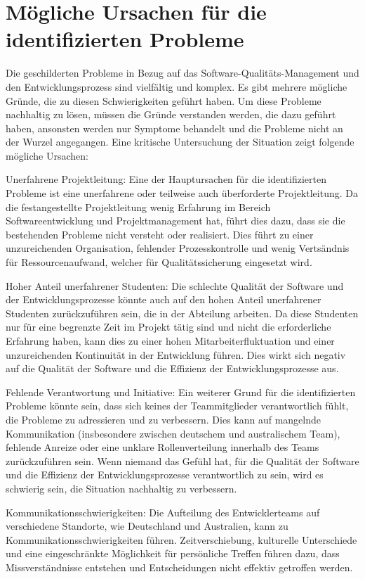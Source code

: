 \section{Mögliche Ursachen für die identifizierten Probleme}

Die geschilderten Probleme in Bezug auf das Software-Qualitäts-Management 
und den Entwicklungsprozess sind vielfältig und komplex. Es gibt mehrere mögliche Gründe, 
die zu diesen Schwierigkeiten geführt haben. Um diese Probleme nachhaltig zu lösen, 
müssen die Gründe verstanden werden, die dazu geführt haben, ansonsten werden nur 
Symptome behandelt und die Probleme nicht an der Wurzel angegangen. 
Eine kritische Untersuchung der Situation zeigt folgende mögliche Ursachen:

Unerfahrene Projektleitung: Eine der Hauptursachen für die identifizierten Probleme 
ist eine unerfahrene oder teilweise auch überforderte Projektleitung. 
Da die festangestellte Projektleitung wenig Erfahrung im Bereich Softwareentwicklung 
und Projektmanagement hat, führt dies dazu, dass sie die bestehenden Probleme nicht versteht 
oder realisiert. Dies führt zu einer unzureichenden Organisation, 
fehlender Prozesskontrolle und wenig Vertsändnis für Ressourcenaufwand, welcher für Qualitätssicherung 
eingesetzt wird.

Hoher Anteil unerfahrener Studenten: Die schlechte Qualität der Software 
und der Entwicklungsprozesse könnte auch auf den hohen Anteil unerfahrener Studenten zurückzuführen sein, 
die in der Abteilung arbeiten. Da diese Studenten nur für eine begrenzte Zeit
im Projekt tätig sind und nicht die erforderliche Erfahrung haben, 
kann dies zu einer hohen Mitarbeiterfluktuation und einer unzureichenden Kontinuität in der Entwicklung führen. 
Dies wirkt sich negativ auf die Qualität der Software und die Effizienz der Entwicklungsprozesse aus.

Fehlende Verantwortung und Initiative: Ein weiterer Grund für die identifizierten Probleme könnte sein, 
dass sich keines der Teammitglieder verantwortlich fühlt, die Probleme zu adressieren und zu verbessern. 
Dies kann auf mangelnde Kommunikation (insbesondere zwischen deutschem und australischem Team), 
fehlende Anreize oder eine unklare Rollenverteilung 
innerhalb des Teams zurückzuführen sein. Wenn niemand das Gefühl hat, 
für die Qualität der Software und die Effizienz der Entwicklungsprozesse verantwortlich zu sein, 
wird es schwierig sein, die Situation nachhaltig zu verbessern.

Kommunikationsschwierigkeiten: Die Aufteilung des Entwicklerteams auf verschiedene Standorte, 
wie Deutschland und Australien, kann zu Kommunikationsschwierigkeiten führen. 
Zeitverschiebung, kulturelle Unterschiede und eine eingeschränkte Möglichkeit 
für persönliche Treffen führen dazu, dass Missverständnisse entstehen und Entscheidungen 
nicht effektiv getroffen werden.

